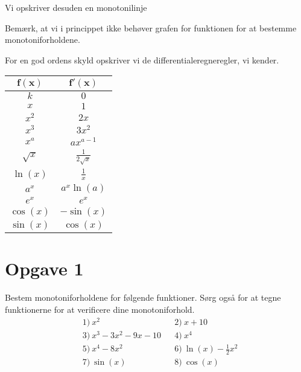 \begin{exa}
Vi opskriver desuden en monotonilinje
\begin{center}
\end{center}
Bemærk, at vi i princippet ikke behøver grafen for funktionen for at bestemme monotoniforholdene. 
\end{exa}

For en god ordens skyld opskriver vi de differentialeregneregler, vi kender.

\begin{center}
	\begin{tabular}{c|c}
		$\boldsymbol{f(x)}$ & $\boldsymbol{f'(x)}$\\
		\hline
		$k$ & $0$\\
		\hline
		$x$ & $1$\\
		\hline 
		$x^2$ & $2x$\\
		\hline
		$x^3$ & $3x^2$\\
		\hline
		$x^a$ & $ax^{a-1}$\\
		\hline 
		$\sqrt{x}$ & $\frac{1}{2\sqrt{x}}$ \\
		\hline
		$\ln(x)$ & $\frac{1}{x}$\\
		\hline
		$a^x$ & $a^x\ln(a)$\\
		\hline 
		$e^x$ & $e^x$\\
		\hline 
		$\cos(x)$ & $-\sin(x)$\\
		\hline
		$\sin(x)$ & $\cos(x)$
	\end{tabular}
\end{center}
\section*{Opgave 1}
Bestem monotoniforholdene for følgende funktioner. Sørg også for at tegne funktionerne for at verificere dine monotoniforhold. 
\begin{align*}
&1) \ x^2   &&2)\ x+10  \\
&3) \ x^3 - 3x^2 - 9x -10 &&4)\ x^4 \\
&5) \ x^4-8x^2 &&6)\ \ln(x) -\frac{1}{2}x^2 \\
&7) \ \sin(x)  &&8)\ \cos(x)  
\end{align*}
